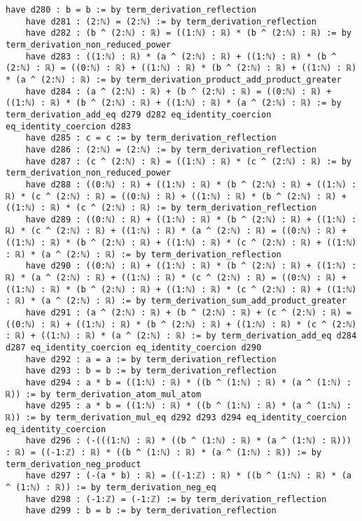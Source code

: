 \documentclass{article}
\begin{document}
\begin{tcolorbox}[colback=white!10, width=\linewidth]
\begin{lstlisting}[language=Lean4]
    have d280 : b = b := by term_derivation_reflection
    have d281 : (2:ℕ) = (2:ℕ) := by term_derivation_reflection
    have d282 : (b ^ (2:ℕ) : ℝ) = ((1:ℕ) : ℝ) * (b ^ (2:ℕ) : ℝ) := by term_derivation_non_reduced_power
    have d283 : ((1:ℕ) : ℝ) * (a ^ (2:ℕ) : ℝ) + ((1:ℕ) : ℝ) * (b ^ (2:ℕ) : ℝ) = ((0:ℕ) : ℝ) + ((1:ℕ) : ℝ) * (b ^ (2:ℕ) : ℝ) + ((1:ℕ) : ℝ) * (a ^ (2:ℕ) : ℝ) := by term_derivation_product_add_product_greater
    have d284 : (a ^ (2:ℕ) : ℝ) + (b ^ (2:ℕ) : ℝ) = ((0:ℕ) : ℝ) + ((1:ℕ) : ℝ) * (b ^ (2:ℕ) : ℝ) + ((1:ℕ) : ℝ) * (a ^ (2:ℕ) : ℝ) := by term_derivation_add_eq d279 d282 eq_identity_coercion eq_identity_coercion d283
    have d285 : c = c := by term_derivation_reflection
    have d286 : (2:ℕ) = (2:ℕ) := by term_derivation_reflection
    have d287 : (c ^ (2:ℕ) : ℝ) = ((1:ℕ) : ℝ) * (c ^ (2:ℕ) : ℝ) := by term_derivation_non_reduced_power
    have d288 : ((0:ℕ) : ℝ) + ((1:ℕ) : ℝ) * (b ^ (2:ℕ) : ℝ) + ((1:ℕ) : ℝ) * (c ^ (2:ℕ) : ℝ) = ((0:ℕ) : ℝ) + ((1:ℕ) : ℝ) * (b ^ (2:ℕ) : ℝ) + ((1:ℕ) : ℝ) * (c ^ (2:ℕ) : ℝ) := by term_derivation_reflection
    have d289 : ((0:ℕ) : ℝ) + ((1:ℕ) : ℝ) * (b ^ (2:ℕ) : ℝ) + ((1:ℕ) : ℝ) * (c ^ (2:ℕ) : ℝ) + ((1:ℕ) : ℝ) * (a ^ (2:ℕ) : ℝ) = ((0:ℕ) : ℝ) + ((1:ℕ) : ℝ) * (b ^ (2:ℕ) : ℝ) + ((1:ℕ) : ℝ) * (c ^ (2:ℕ) : ℝ) + ((1:ℕ) : ℝ) * (a ^ (2:ℕ) : ℝ) := by term_derivation_reflection
    have d290 : ((0:ℕ) : ℝ) + ((1:ℕ) : ℝ) * (b ^ (2:ℕ) : ℝ) + ((1:ℕ) : ℝ) * (a ^ (2:ℕ) : ℝ) + ((1:ℕ) : ℝ) * (c ^ (2:ℕ) : ℝ) = ((0:ℕ) : ℝ) + ((1:ℕ) : ℝ) * (b ^ (2:ℕ) : ℝ) + ((1:ℕ) : ℝ) * (c ^ (2:ℕ) : ℝ) + ((1:ℕ) : ℝ) * (a ^ (2:ℕ) : ℝ) := by term_derivation_sum_add_product_greater
    have d291 : (a ^ (2:ℕ) : ℝ) + (b ^ (2:ℕ) : ℝ) + (c ^ (2:ℕ) : ℝ) = ((0:ℕ) : ℝ) + ((1:ℕ) : ℝ) * (b ^ (2:ℕ) : ℝ) + ((1:ℕ) : ℝ) * (c ^ (2:ℕ) : ℝ) + ((1:ℕ) : ℝ) * (a ^ (2:ℕ) : ℝ) := by term_derivation_add_eq d284 d287 eq_identity_coercion eq_identity_coercion d290
    have d292 : a = a := by term_derivation_reflection
    have d293 : b = b := by term_derivation_reflection
    have d294 : a * b = ((1:ℕ) : ℝ) * ((b ^ (1:ℕ) : ℝ) * (a ^ (1:ℕ) : ℝ)) := by term_derivation_atom_mul_atom
    have d295 : a * b = ((1:ℕ) : ℝ) * ((b ^ (1:ℕ) : ℝ) * (a ^ (1:ℕ) : ℝ)) := by term_derivation_mul_eq d292 d293 d294 eq_identity_coercion eq_identity_coercion
    have d296 : (-(((1:ℕ) : ℝ) * ((b ^ (1:ℕ) : ℝ) * (a ^ (1:ℕ) : ℝ))) : ℝ) = ((-1:ℤ) : ℝ) * ((b ^ (1:ℕ) : ℝ) * (a ^ (1:ℕ) : ℝ)) := by term_derivation_neg_product
    have d297 : (-(a * b) : ℝ) = ((-1:ℤ) : ℝ) * ((b ^ (1:ℕ) : ℝ) * (a ^ (1:ℕ) : ℝ)) := by term_derivation_neg_eq
    have d298 : (-1:ℤ) = (-1:ℤ) := by term_derivation_reflection
    have d299 : b = b := by term_derivation_reflection

\end{lstlisting}
\end{tcolorbox}
\end{document}
